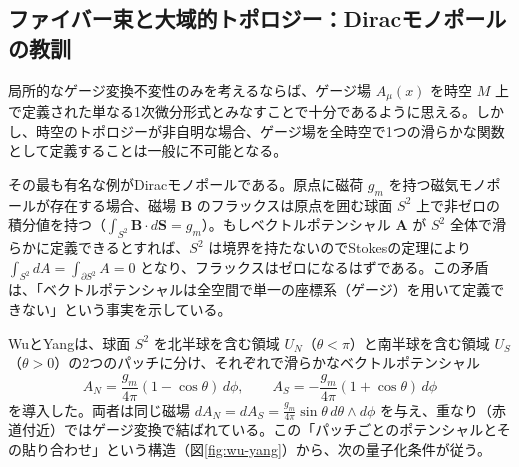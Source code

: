 \documentclass[uplatex, dvipdfmx, book]{jsbook}
\let\origsubsection\subsection
\let\origsubsubsection\subsubsection
\renewcommand{\section}{\origsubsection}
\renewcommand{\subsection}{\origsubsubsection}
\renewcommand{\subsubsection}{\paragraph}
\begin{document}
\section{ファイバー束と大域的トポロジー：Diracモノポールの教訓}

局所的なゲージ変換不変性のみを考えるならば、ゲージ場 $A_\mu(x)$ を時空 $M$ 上で定義された単なる1次微分形式とみなすことで十分であるように思える。しかし、時空のトポロジーが非自明な場合、ゲージ場を全時空で1つの滑らかな関数として定義することは一般に不可能となる。

その最も有名な例がDiracモノポールである。原点に磁荷 $g_m$ を持つ磁気モノポールが存在する場合、磁場 $\bm{B}$ のフラックスは原点を囲む球面 $S^2$ 上で非ゼロの積分値を持つ（$\int_{S^2} \bm{B} \cdot d\bm{S} = g_m$）。もしベクトルポテンシャル $\bm{A}$ が $S^2$ 全体で滑らかに定義できるとすれば、$S^2$ は境界を持たないのでStokesの定理により $\int_{S^2} dA = \int_{\partial S^2} A = 0$ となり、フラックスはゼロになるはずである。この矛盾は、「ベクトルポテンシャルは全空間で単一の座標系（ゲージ）を用いて定義できない」という事実を示している。

WuとYang\cite{wuyang1975}は、球面 $S^2$ を北半球を含む領域 $U_N$（$\theta < \pi$）と南半球を含む領域 $U_S$（$\theta > 0$）の2つのパッチに分け、それぞれで滑らかなベクトルポテンシャル
\begin{equation}
    A_N = \frac{g_m}{4\pi}(1 - \cos\theta)\, d\phi, \qquad A_S = -\frac{g_m}{4\pi}(1 + \cos\theta)\, d\phi
\end{equation}
を導入した。両者は同じ磁場 $dA_N = dA_S = \frac{g_m}{4\pi}\sin\theta\, d\theta \wedge d\phi$ を与え、重なり（赤道付近）ではゲージ変換で結ばれている。この「パッチごとのポテンシャルとその貼り合わせ」という構造（図\ref{fig:wu-yang}）から、次の量子化条件が従う。
\end{document}
